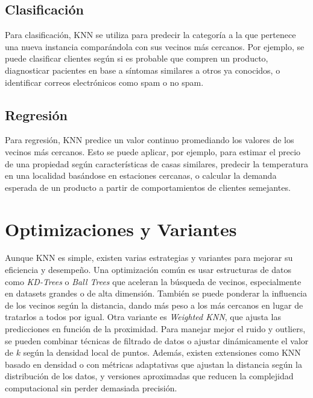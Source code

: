 \documentclass[12pt]{article}
\begin{document}
\subsection{Clasificación}

Para clasificación, KNN se utiliza para predecir la categoría a la que pertenece una nueva instancia comparándola con sus vecinos más cercanos. Por ejemplo, se puede clasificar clientes según si es probable que compren un producto, diagnosticar pacientes en base a síntomas similares a otros ya conocidos, o identificar correos electrónicos como spam o no spam.

\subsection{Regresión}

Para regresión, KNN predice un valor continuo promediando los valores de los vecinos más cercanos. Esto se puede aplicar, por ejemplo, para estimar el precio de una propiedad según características de casas similares, predecir la temperatura en una localidad basándose en estaciones cercanas, o calcular la demanda esperada de un producto a partir de comportamientos de clientes semejantes.

\section{Optimizaciones y Variantes}

Aunque KNN es simple, existen varias estrategias y variantes para mejorar su eficiencia y desempeño. Una optimización común es usar estructuras de datos como \textit{KD-Trees} o \textit{Ball Trees} que aceleran la búsqueda de vecinos, especialmente en datasets grandes o de alta dimensión. También se puede ponderar la influencia de los vecinos según la distancia, dando más peso a los más cercanos en lugar de tratarlos a todos por igual. Otra variante es \textit{Weighted KNN}, que ajusta las predicciones en función de la proximidad. Para manejar mejor el ruido y outliers, se pueden combinar técnicas de filtrado de datos o ajustar dinámicamente el valor de $k$ según la densidad local de puntos. Además, existen extensiones como KNN basado en densidad o con métricas adaptativas que ajustan la distancia según la distribución de los datos, y versiones aproximadas que reducen la complejidad computacional sin perder demasiada precisión.
\end{document}
